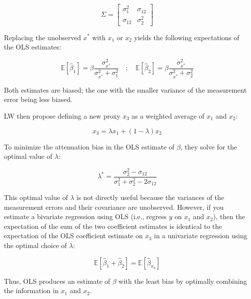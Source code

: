 \documentclass[12pt,english]{article}
\begin{document}
\[
\Sigma = \begin{bmatrix}
    \sigma_1^2 & \sigma_{12} \\
    \sigma_{12} & \sigma_2^2
\end{bmatrix}
\]

Replacing the unobserved \(x^*\) with \(x_1\) or \(x_2\) yields the following expectations of the OLS estimates:

\[
\mathbb{E} \left[ \hat{\beta}_1 \right] = \beta \frac{\sigma_{x^*}^2}{\sigma_{x^*}^2 + \sigma_1^2} \quad ; \quad \mathbb{E} \left[ \hat{\beta}_2 \right] = \beta \frac{\sigma_{x^*}^2}{\sigma_{x^*}^2 + \sigma_2^2}
\]

Both estimates are biased; the one with the smaller variance of the measurement error being less biased.

LW then propose defining a new proxy \(x_3\) as a weighted average of \(x_1\) and \(x_2\):

\[
x_3 = \lambda x_1 + (1 - \lambda) x_2
\]

To minimize the attenuation bias in the OLS estimate of \(\beta\), they solve for the optimal value of \(\lambda\):

\[
\lambda^* = \frac{\sigma_2^2 - \sigma_{12}}{\sigma_1^2 + \sigma_2^2 - 2\sigma_{12}}
\]

This optimal value of \(\lambda\) is not directly useful because the variances of the measurement errors and their covariance are unobserved. However, if you estimate a bivariate regression using OLS (i.e., regress \(y\) on \(x_1\) and \(x_2\)), then the expectation of the sum of the two coefficient estimates is identical to the expectation of the OLS coefficient estimate on \(x_3\) in a univariate regression using the optimal choice of \(\lambda\):

\[
\mathbb{E} \left[ \hat{\beta}_1 + \hat{\beta}_2 \right] = \mathbb{E} \left[ \hat{\beta}_{x_3} \right]
\]

Thus, OLS produces an estimate of \(\beta\) with the least bias by optimally combining the information in \(x_1\) and \(x_2\).

\clearpage
\end{document}
